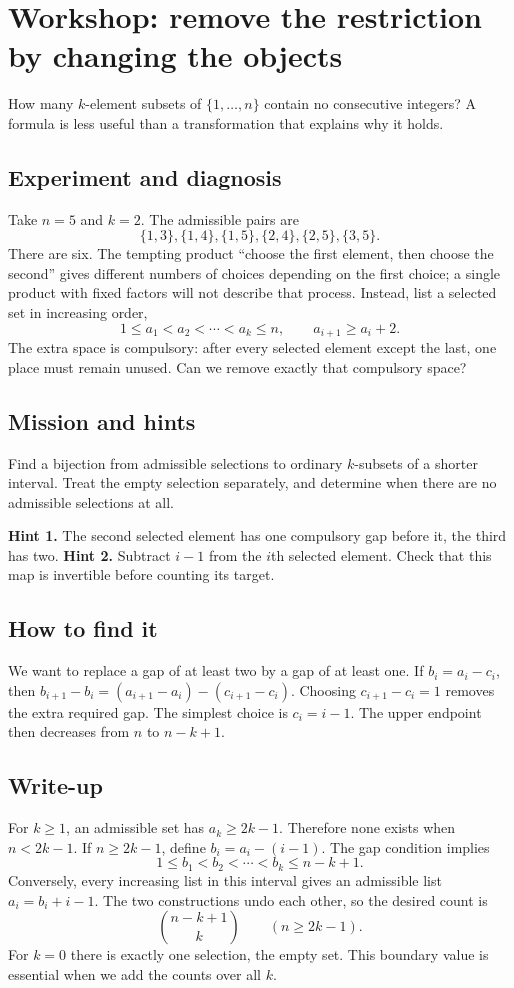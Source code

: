 \section{Workshop: remove the restriction by changing the objects}
How many $k$-element subsets of $\{1,\dots,n\}$ contain no consecutive integers? A formula is less useful than a transformation that explains why it holds.

\subsection*{Experiment and diagnosis}
Take $n=5$ and $k=2$. The admissible pairs are
\[
\{1,3\},\{1,4\},\{1,5\},\{2,4\},\{2,5\},\{3,5\}.
\]
There are six. The tempting product ``choose the first element, then choose the second'' gives different numbers of choices depending on the first choice; a single product with fixed factors will not describe that process. Instead, list a selected set in increasing order,
\[
1\le a_1<a_2<\cdots<a_k\le n,
\qquad a_{i+1}\ge a_i+2.
\]
The extra space is compulsory: after every selected element except the last, one place must remain unused. Can we remove exactly that compulsory space?

\subsection*{Mission and hints}
Find a bijection from admissible selections to ordinary $k$-subsets of a shorter interval. Treat the empty selection separately, and determine when there are no admissible selections at all.

\textbf{Hint 1.} The second selected element has one compulsory gap before it, the third has two. \textbf{Hint 2.} Subtract $i-1$ from the $i$th selected element. Check that this map is invertible before counting its target.

\subsection*{How to find it}
We want to replace a gap of at least two by a gap of at least one. If $b_i=a_i-c_i$, then $b_{i+1}-b_i=(a_{i+1}-a_i)-(c_{i+1}-c_i)$. Choosing $c_{i+1}-c_i=1$ removes the extra required gap. The simplest choice is $c_i=i-1$. The upper endpoint then decreases from $n$ to $n-k+1$.

\subsection*{Write-up}
For $k\ge1$, an admissible set has $a_k\ge2k-1$. Therefore none exists when $n<2k-1$. If $n\ge2k-1$, define $b_i=a_i-(i-1)$. The gap condition implies
\[
1\le b_1<b_2<\cdots<b_k\le n-k+1.
\]
Conversely, every increasing list in this interval gives an admissible list $a_i=b_i+i-1$. The two constructions undo each other, so the desired count is
\[
\binom{n-k+1}{k}\qquad(n\ge2k-1).
\]
For $k=0$ there is exactly one selection, the empty set. This boundary value is essential when we add the counts over all $k$.

